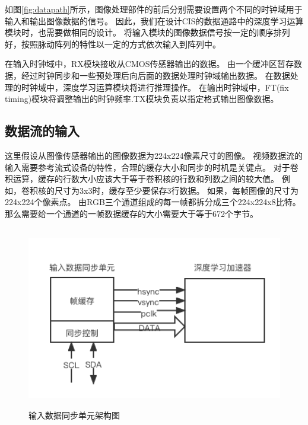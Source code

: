 如图\ref{fig:datapath}所示，图像处理部件的前后分别需要设置两个不同的时钟域用于输入和输出图像数据的信号。
因此，我们在设计CIS的数据通路中的深度学习运算模块时，也需要做相同的设计。
将输入模块的图像数据信号按一定的顺序排列好，按照脉动阵列的特性以一定的方式依次输入到阵列中。


在输入时钟域中，RX模块接收从CMOS传感器输出的数据。
由一个缓冲区暂存数据，经过时钟同步和一些预处理后向后面的数据处理时钟域输出数据。
在数据处理的时钟域中，深度学习运算模块将进行推理操作。
在输出时钟域中，FT(fix timing)模块将调整输出的时钟频率.TX模块负责以指定格式输出图像数据。  

\subsection{数据流的输入}

这里假设从图像传感器输出的图像数据为224x224像素尺寸的图像。
视频数据流的输入需要参考流式设备的特性，合理的缓存大小和同步的时机是关键点。
对于卷积运算，缓存的行数大小应该大于等于卷积核的行数和列数之间的较大值。
例如，卷积核的尺寸为3x3时，缓存至少要保存3行数据。
如果，每帧图像的尺寸为224x224个像素点。
由RGB三个通道组成的每一帧都拆分成三个224x224x8比特。
那么需要给一个通道的一帧数据缓存的大小需要大于等于672个字节。

\begin{figure}[htbp]
    \centering
    \includegraphics[width=12cm,height=8cm]{figures/input_data_adapter.png}
    \caption{输入数据同步单元架构图}
    \label{fig:input_data_adapter}
\end{figure}

